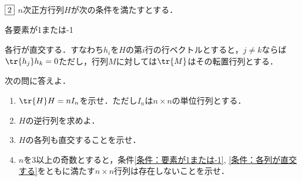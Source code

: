 \begin{tcolorbox} %
	$\fbox{2}$ $n$次正方行列$H$が次の条件を満たすとする．
\begin{enumerate_alpha}
	\item\label{条件：要素が1または-1} 各要素が1または-1
	\item\label{条件：各行が直交する} 各行が直交する．すなわち$h_i$を$H$の第$i$行の行ベクトルとすると，$j\ne k$ならば$\tr{h_j}h_k= 0$ただし，行列$M$に対しては$\tr{M}$はその転置行列とする．
\end{enumerate_alpha}
	次の問に答えよ．
\begin{enumerate}
	\item $\tr{H} H= nI_n$を示せ．ただし$I_n$は$n\times n$の単位行列とする．
	\item $H$の逆行列を求めよ．
	\item $H$の各列も直交することを示せ．
	\item $n$を3以上の奇数とすると，条件\ref{条件：要素が1または-1}, \ref{条件：各列が直交する}をともに満たす$n\times n$行列は存在しないことを示せ．
\end{enumerate}
\end{tcolorbox}

